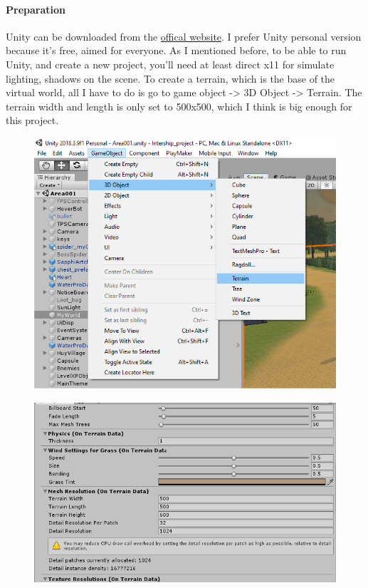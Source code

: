 \documentclass[a4paper, 13pt]{extarticle}
\begin{document}
 		  \paragraph{Preparation}
 		  Unity can be downloaded from the \href{https://store.Unity.com/}{offical website}. I prefer Unity personal version because it's free, aimed for everyone. As I mentioned before, to be able to run Unity, and create a new project, you'll need at least direct x11 for simulate lighting, shadows on the scene. To create a terrain, which is the base of the virtual world, all I have to do is go to game object -> 3D Object -> Terrain. The terrain width and length is only set to 500x500, which I think is big enough for this project.  \begin{figure}[h]
 		  	\centering
 		  	\begin{minipage}{.4\textwidth}
 		  		\centering
 		  		\includegraphics[width=1\linewidth]{intructions/1.png}
 		  		\label{fig:test2}
 		  	\end{minipage}
 		  	\begin{minipage}{.4\textwidth}
 		  		\centering
 		  		\includegraphics[width=1.4\linewidth]{intructions/2.png}
 		  		\label{fig:test3}
 		  	\end{minipage}
 		  \end{figure}
\end{document}
